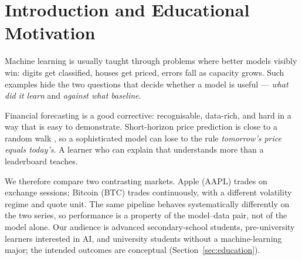 \section{Introduction and Educational Motivation}
\label{sec:intro}

Machine learning is usually taught through problems where better models visibly
win: digits get classified, houses get priced, errors fall as capacity grows.
Such examples hide the two questions that decide whether a model is useful ---
\emph{what did it learn} and \emph{against what baseline}.

Financial forecasting is a good corrective: recognisable, data-rich, and hard in
a way that is easy to demonstrate. Short-horizon price prediction is close to a
random walk \citep{fama1970efficient}, so a sophisticated model can lose to the
rule \emph{tomorrow's price equals today's}. A learner who can explain that understands more than a leaderboard teaches.

We therefore compare two contrasting markets. Apple (AAPL) trades on exchange
sessions; Bitcoin (BTC) trades continuously, with a different volatility regime
and quote unit. The same pipeline behaves systematically differently on the two series, so
performance is a property of the model--data pair, not of the model alone. Our audience is advanced secondary-school students,
pre-university learners interested in AI, and university students without a
machine-learning major; the intended outcomes are conceptual
(Section~\ref{sec:education}).
